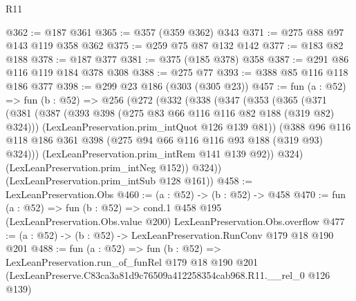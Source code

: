 \begin{lexlean}{R11}
\begin{coremodule}
@362 := @187 @361
@365 := @357 (@359 @362) @343
@371 := @275 @88 @97 @143 @119 @358 @362
@375 := @259 @75 @87 @132 @142
@377 := @183 @82 @188
@378 := @187 @377
@381 := @375 (@185 @378) @358
@387 := @291 @86 @116 @119 @184 @378 @308
@388 := @275 @77
@393 := @388 @85 @116 @118 @186 @377
@398 := @299 @23 @186 (@303 (@305 @23))
@457 := fun (a : @52) =>
  fun (b : @52) =>
  @256
    (@272
      (@332
        (@338
          (@347
            (@353
              (@365
                (@371
                  (@381
                    (@387 (@393 @398 (@275 @83 @66 @116 @116 @82 @188 (@319 @82) @324)))
                    (LexLeanPreservation.prim_intQuot @126 @139 @81))
                  (@388
                    @96
                    @116
                    @118
                    @186
                    @361
                    @398
                    (@275 @94 @66 @116 @116 @93 @188 (@319 @93) @324)))
                (LexLeanPreservation.prim_intRem @141 @139 @92))
              @324)
            (LexLeanPreservation.prim_intNeg @152))
          @324))
      (LexLeanPreservation.prim_intSub @128 @161))
@458 := LexLeanPreservation.Obs
@460 := (a : @52) -> (b : @52) -> @458
@470 := fun (a : @52) =>
  fun (b : @52) =>
  cond.{1} @458 @195 (LexLeanPreservation.Obs.value @200) LexLeanPreservation.Obs.overflow
@477 := (a : @52) -> (b : @52) -> LexLeanPreservation.RunConv @179 @18 @190 @201
@488 := fun (a : @52) =>
  fun (b : @52) =>
  LexLeanPreservation.run_of_funRel
    @179
    @18
    @190
    @201
    (LexLeanPreserve.C83ca3a81d9c76509a412258354cab968.R11.__rel_0 @126 @139)
\end{coremodule}
\end{lexlean}
